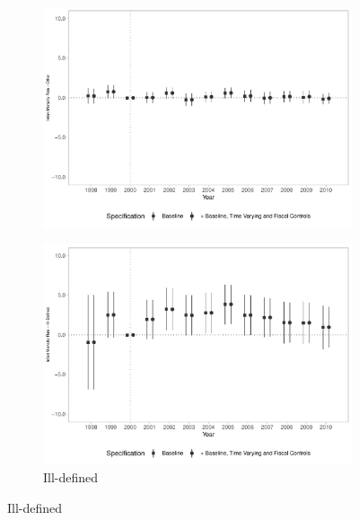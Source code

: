 \begin{figure}[h!]
\begin{center}
\begin{subfigure}{0.32\textwidth}
        \includegraphics[width=\textwidth]{plots/tx_mi_out_dist_ec29_baseline_dist_ec29_baseline_18.pdf}
    \end{subfigure}
        \begin{subfigure}{0.32\textwidth}
        \centering
        \caption{\scriptsize Ill-defined}\label{fig:18h}
        \includegraphics[width=\textwidth]{plots/tx_mi_illdef_dist_ec29_baseline_dist_ec29_baseline_18.pdf}
    \end{subfigure}
    \end{center}
    
\end{figure}